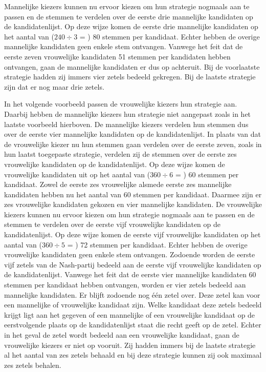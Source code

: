Mannelijke kiezers kunnen nu ervoor kiezen om hun strategie nogmaals aan te passen en de stemmen te verdelen over de eerste drie mannelijke kandidaten op de kandidatenlijst. Op deze wijze komen de eerste drie mannelijke kandidaten op het aantal van ($240\div3$ = ) 80 stemmen per kandidaat. Echter hebben de overige mannelijke kandidaten geen enkele stem ontvangen. Vanwege het feit dat de eerste zeven vrouwelijke kandidaten 51 stemmen per kandidaten hebben ontvangen, gaan de mannelijke kandidaten er dus op achteruit. Bij de voorlaatste strategie hadden zij immers vier zetels bedeeld gekregen. Bij de laatste strategie zijn dat er nog maar drie zetels.

In het volgende voorbeeld passen de vrouwelijke kiezers hun strategie aan. Daarbij hebben de mannelijke kiezers hun strategie niet aangepast zoals in het laatste voorbeeld hierboven. De mannelijke kiezers verdelen hun stemmen dus over de eerste vier mannelijke kandidaten op de kandidatenlijst. In plaats van dat de vrouwelijke kiezer nu hun stemmen gaan verdelen over de eerste zeven, zoals in hun laatst toegepaste strategie, verdelen zij de stemmen over de eerste zes vrouwelijke kandidaten op de kandidatenlijst. Op deze wijze komen de vrouwelijke kandidaten uit op het aantal van ($360\div6$ = ) 60 stemmen per kandidaat. Zowel de eerste zes vrouwelijke alsmede eerste zes mannelijke kandidaten hebben nu het aantal van 60 stemmen per kandidaat. Daarmee zijn er zes vrouwelijke kandidaten gekozen en vier mannelijke kandidaten. De vrouwelijke kiezers kunnen nu ervoor kiezen om hun strategie nogmaals aan te passen en de stemmen te verdelen over de eerste vijf vrouwelijke kandidaten op de kandidatenlijst. Op deze wijze komen de eerste vijf vrouwelijke kandidaten op het aantal van ($360\div5$ = ) 72 stemmen per kandidaat. Echter hebben de overige vrouwelijke kandidaten geen enkele stem ontvangen. Zodoende worden de eerste vijf zetels van de Nash-partij bedeeld aan de eerste vijf vrouwelijke kandidaten op de kandidatenlijst. Vanwege het feit dat de eerste vier mannelijke kandidaten 60 stemmen per kandidaat hebben ontvangen, worden er vier zetels bedeeld aan mannelijke kandidaten. Er blijft zodoende nog één zetel over. Deze zetel kan voor een mannelijke of vrouwelijke kandidaat zijn. Welke kandidaat deze zetels bedeeld krijgt ligt aan het gegeven of een mannelijke of een vrouwelijke kandidaat op de eerstvolgende plaats op de kandidatenlijst staat die recht geeft op de zetel. Echter in het geval de zetel wordt bedeeld aan een vrouwelijke kandidaat, gaan de vrouwelijke kiezers er niet op vooruit. Zij hadden immers bij de laatste strategie al het aantal van zes zetels behaald en bij deze strategie kunnen zij ook maximaal zes zetels behalen. 

